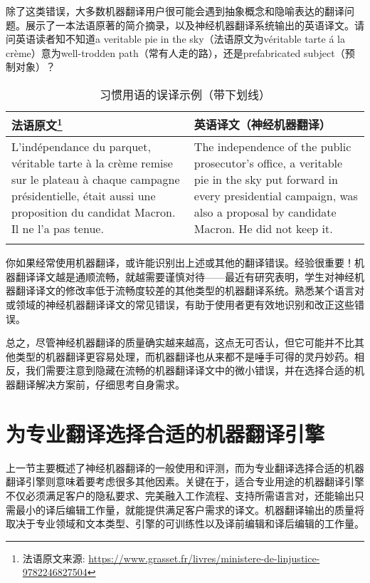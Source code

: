 \documentclass[output=paper]{langscibook}
\begin{document}
除了这类错误，大多数机器翻译用户很可能会遇到抽象概念和隐喻表达的翻译问题。展示了一本法语原著的简介摘录，以及神经机器翻译系统输出的英语译文。请问英语读者知不知道a veritable pie in the sky（法语原文为véritable tarte á la crème）意为well-trodden path（常有人走的路），还是prefabricated subject（预制对象）？

\begin{table}
\begin{tabularx}{\textwidth}{XX}
\lsptoprule
{法语原文\footnote{法语原文来源: \url{https://www.grasset.fr/livres/ministere-de-linjustice-9782246827504}}} & {英语译文（神经机器翻译）}\\
\midrule
L’indépendance du parquet, véritable tarte à la crème remise sur le plateau à chaque campagne présidentielle, était aussi une proposition du candidat Macron. Il ne l’a pas tenue. & The independence of the public prosecutor's office, a veritable pie in the sky put forward in every presidential campaign, was also a proposal by candidate Macron. He did not keep it.\\
\lspbottomrule
\end{tabularx}
\caption{习惯用语的误译示例（带下划线）}
\label{tab:rossi:2}
\end{table}

你如果经常使用机器翻译，或许能识别出上述或其他的翻译错误。经验很重要！机器翻译译文越是通顺流畅，就越需要谨慎对待——最近有研究表明，学生对神经机器翻译译文的修改率低于流畅度较差的其他类型的机器翻译系统\citep{Yamada2019}。熟悉某个语言对或领域的神经机器翻译译文的常见错误，有助于使用者更有效地识别和改正这些错误。

总之，尽管神经机器翻译的质量确实越来越高，这点无可否认，但它可能并不比其他类型的机器翻译更容易处理，而机器翻译也从来都不是唾手可得的灵丹妙药。相反，我们需要注意到隐藏在流畅的机器翻译译文中的微小错误，并在选择合适的机器翻译解决方案前，仔细思考自身需求。


\section{为专业翻译选择合适的机器翻译引擎}

上一节主要概述了神经机器翻译的一般使用和评测，而为专业翻译选择合适的机器翻译引擎则意味着要考虑很多其他因素。关键在于，适合专业用途的机器翻译引擎不仅必须满足客户的隐私要求、完美融入工作流程、支持所需语言对，还能输出只需最小的译后编辑工作量，就能提供满足客户需求的译文。机器翻译输出的质量将取决于专业领域和文本类型、引擎的可训练性以及译前编辑和译后编辑的工作量。
\end{document}

